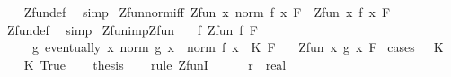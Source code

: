 \begin{isabellebody}
%
\isadelimproof
\ \ %
\endisadelimproof
%
\isatagproof
{}\isamarkupfalse%
\ Zfun{\isacharunderscore}{\kern0pt}def\ \isamarkupfalse%
\ simp%
\endisatagproof
{\isafoldproof}%
%
\isadelimproof
\isanewline
%
\endisadelimproof
\isanewline
{}\isamarkupfalse%
\ Zfun{\isacharunderscore}{\kern0pt}norm{\isacharunderscore}{\kern0pt}iff{\isacharcolon}{\kern0pt}\ {\isachardoublequoteopen}Zfun\ {\isacharparenleft}{\kern0pt}{\isasymlambda}x{\isachardot}{\kern0pt}\ norm\ {\isacharparenleft}{\kern0pt}f\ x{\isacharparenright}{\kern0pt}{\isacharparenright}{\kern0pt}\ F\ {\isacharequal}{\kern0pt}\ Zfun\ {\isacharparenleft}{\kern0pt}{\isasymlambda}x{\isachardot}{\kern0pt}\ f\ x{\isacharparenright}{\kern0pt}\ F{\isachardoublequoteclose}\isanewline
%
\isadelimproof
\ \ %
\endisadelimproof
%
\isatagproof
{}\isamarkupfalse%
\ Zfun{\isacharunderscore}{\kern0pt}def\ \isamarkupfalse%
\ simp%
\endisatagproof
{\isafoldproof}%
%
\isadelimproof
\isanewline
%
\endisadelimproof
\isanewline
{}\isamarkupfalse%
\ Zfun{\isacharunderscore}{\kern0pt}imp{\isacharunderscore}{\kern0pt}Zfun{\isacharcolon}{\kern0pt}\isanewline
\ \ \ f{\isacharcolon}{\kern0pt}\ {\isachardoublequoteopen}Zfun\ f\ F{\isachardoublequoteclose}\isanewline
\ \ \ \ \ g{\isacharcolon}{\kern0pt}\ {\isachardoublequoteopen}eventually\ {\isacharparenleft}{\kern0pt}{\isasymlambda}x{\isachardot}{\kern0pt}\ norm\ {\isacharparenleft}{\kern0pt}g\ x{\isacharparenright}{\kern0pt}\ {\isasymle}\ norm\ {\isacharparenleft}{\kern0pt}f\ x{\isacharparenright}{\kern0pt}\ {\isacharasterisk}{\kern0pt}\ K{\isacharparenright}{\kern0pt}\ F{\isachardoublequoteclose}\isanewline
\ \ \ {\isachardoublequoteopen}Zfun\ {\isacharparenleft}{\kern0pt}{\isasymlambda}x{\isachardot}{\kern0pt}\ g\ x{\isacharparenright}{\kern0pt}\ F{\isachardoublequoteclose}\isanewline
%
\isadelimproof
%
\endisadelimproof
%
\isatagproof
{}\isamarkupfalse%
\ {\isacharparenleft}{\kern0pt}cases\ {\isachardoublequoteopen}{}\ {\isacharless}{\kern0pt}\ K{\isachardoublequoteclose}{\isacharparenright}{\kern0pt}\isanewline
\ \ \isamarkupfalse%
\ K{\isacharcolon}{\kern0pt}\ True\isanewline
\ \ \isamarkupfalse%
\ {\isacharquery}{\kern0pt}thesis\isanewline
\ \ \isamarkupfalse%
\ {\isacharparenleft}{\kern0pt}rule\ ZfunI{\isacharparenright}{\kern0pt}\isanewline
\ \ \ \ \isamarkupfalse%
\ r\ {\isacharcolon}{\kern0pt}{\isacharcolon}{\kern0pt}\ real\isanewline

\end{isabellebody}
